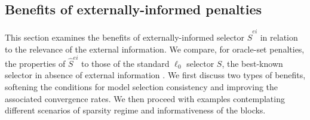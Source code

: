 \documentclass[
  12pt]{article}
\newcommand{\bX}{\mathbf{X}}
\newtheorem{cor}[thm]{\textsc{Corollary}}
\begin{document}


\subsection{Benefits of externally-informed penalties}
\label{ssec:regression_gains}

This section examines the benefits of externally-informed selector $\hat S^{ei}$ in relation to the relevance of the external information. We compare, for oracle-set penalties, the properties of $\hat S^{ei}$ to those of the standard $\ell_0$ selector $S$, the best-known selector in absence of external information \cite{}. We first discuss two types of benefits, softening the conditions for model selection consistency and improving the associated convergence rates. We then proceed with examples contemplating different scenarios of sparsity regime and informativeness of the blocks.
\end{document}
